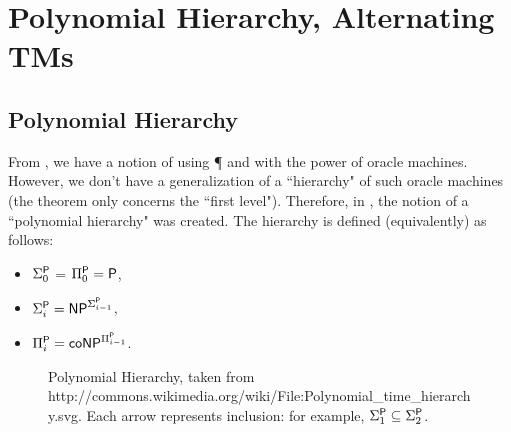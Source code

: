 \section{Polynomial Hierarchy, Alternating TMs}

\subsection{Polynomial Hierarchy}

From , we have a notion of using {\P} and {\NP} with the power of oracle machines. However, we don't have a generalization of a ``hierarchy" of such oracle machines (the theorem only concerns the ``first level"). Therefore, in \cite{originalpolyhierarchypaper}, the notion of a ``polynomial hierarchy" was created. The hierarchy is defined (equivalently) as follows:
\begin{itemize}
\item $\Sigma_0^\P$ = $\Pi_0^\P = \P$,
\item $\Sigma_i^\P = \NP^{\Sigma_{i-1}^\P}$, 
\item $\Pi_i^\P = \coNP^{\Pi_{i-1}^\P}$.
\end{itemize}

\begin{figure}
\label{fig:polyhierarchy}
\caption{Polynomial Hierarchy, taken from http://commons.wikimedia.org/wiki/File:Polynomial\_time\_hierarchy.svg. Each arrow represents inclusion: for example, $\Sigma_1^\P \subseteq \Sigma_2^\P$.}
\centering
{}
\end{figure}

